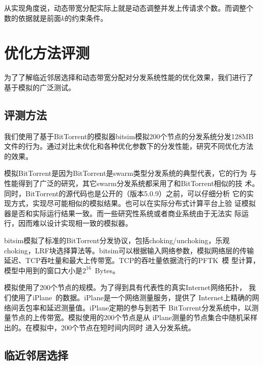 
从实现角度说，动态带宽分配实际上就是动态调整并发上传请求个数。而调整个
数的依据就是前面$k$的约束条件。

\section{优化方法评测}
\label{sec:bteval}

为了了解临近邻居选择和动态带宽分配对分发系统性能的优化效果，我们进行了
基于模拟的广泛测试。

\subsection{评测方法}

我们使用了基于BitTorrent的模拟器bitsim模拟200个节点的分发系统分发128MB
文件的行为。通过对比未优化和各种优化参数下的分发性能，研究不同优化方法
的效果。

模拟BitTorrent是因为BitTorrent是swarm类型分发系统的典型代表，它的行为
与性能得到了广泛的研究，其它swarm分发系统都采用了和BitTorrent相似的技
术。同时，BitTorrent的源代码也是公开的（版本5.0.9）之前，可以仔细分析
它的实现方式，实现尽可能相似的模拟结果。也可以在实际分布式计算平台上验
证模拟器是否和实际运行结果一致。而一些研究性系统或者商业系统由于无法实
际运行，因而难以设计实现相一致的模拟器。

bitsim模拟了标准的BitTorrent分发协议，包括choking/unchoking，乐观
choking，LRF块选择算法等。bitsim可以根据输入网络参数，模拟网络层的传输
延迟、TCP吞吐量和最大上传带宽。TCP的吞吐量依据流行的PFTK~\cite{pftk}模
型计算，模型中用到的窗口大小是$2^{16}$~Bytes。

模拟使用了200个节点的规模。为了得到具有代表性的真实Internet网络拓扑，
我们使用了iPlane~\cite{iplane}的数据。iPlane是一个网络测量服务，提供了
Internet上精确的网络间丢包率和延迟测量值。iPlane定期的参与到若干
BitTorrent分发系统中，以测量节点的上传带宽。模拟使用的200个节点是从
iPlane测量的节点集合中随机采样出的。在模拟中，200个节点在短时间内同时
进入分发系统。



\subsection{临近邻居选择}


